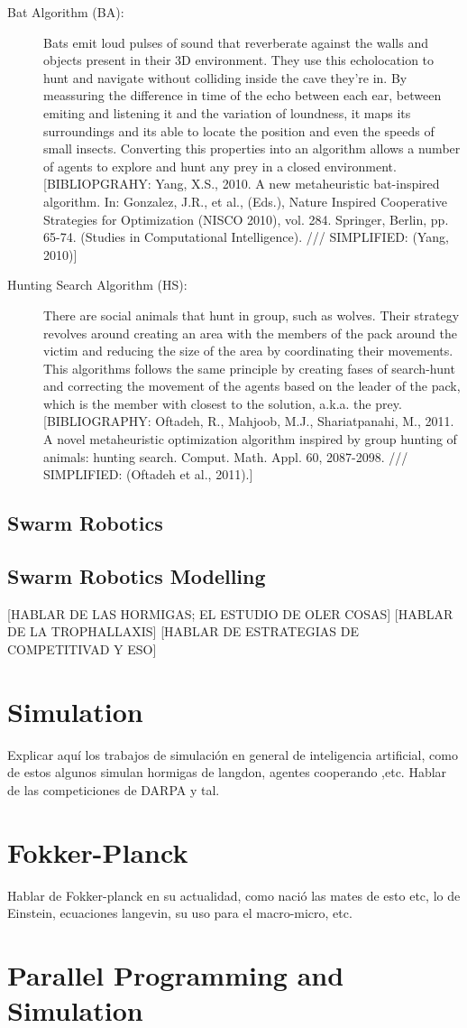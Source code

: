 \begin{description}
\item[Bat Algorithm (BA):] Bats emit loud pulses of sound that reverberate against the walls and objects present in their 3D environment. They use this echolocation to hunt and navigate without colliding inside the cave they're in. By meassuring the difference in time of the echo between each ear, between emiting and listening it and the variation of loundness, it maps its surroundings and its able to locate the position and even the speeds of small insects. Converting this properties into an algorithm allows a number of agents to explore and hunt any prey in a closed environment. [BIBLIOPGRAHY: Yang, X.S., 2010. A new metaheuristic bat-inspired algorithm. In: Gonzalez, J.R., et al., (Eds.), Nature Inspired Cooperative Strategies for Optimization (NISCO 2010), vol. 284. Springer, Berlin, pp. 65-74. (Studies in Computational Intelligence). /// SIMPLIFIED: (Yang, 2010)]

\item[Hunting Search Algorithm (HS):] There are social animals that hunt in group, such as wolves. Their strategy revolves around creating an area with the members of the pack around the victim and reducing the size of the area by coordinating their movements. This algorithms follows the same principle by creating fases of search-hunt and correcting the movement of the agents based on the leader of the pack, which is the member with closest to the solution, a.k.a. the prey. [BIBLIOGRAPHY: Oftadeh, R., Mahjoob, M.J., Shariatpanahi, M., 2011. A novel metaheuristic optimization algorithm inspired by group hunting of animals: hunting search. Comput. Math. Appl. 60, 2087-2098. /// SIMPLIFIED: (Oftadeh et al., 2011).]
\end{description}

\subsection{Swarm Robotics}


\subsection{Swarm Robotics Modelling}

[HABLAR DE LAS HORMIGAS; EL ESTUDIO DE OLER COSAS]
[HABLAR DE LA TROPHALLAXIS]
[HABLAR DE ESTRATEGIAS DE COMPETITIVAD Y ESO]


\section{Simulation}
Explicar aquí los trabajos de simulación en general de inteligencia artificial, como de estos algunos simulan hormigas de langdon, agentes cooperando ,etc. Hablar de las competiciones de DARPA y tal.

\section{Fokker-Planck}
Hablar de Fokker-planck en su actualidad, como nació las mates de esto etc, lo de Einstein, ecuaciones langevin, su uso para el macro-micro, etc.

\section{Parallel Programming and Simulation}